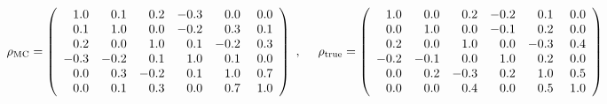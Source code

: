 \[
  \rho_{\rm MC} =
  \left(
  \begin{array}{rrrrrr}
    1.0 & 0.1 & 0.2 & -0.3 & 0.0 & 0.0 \\
    0.1 & 1.0 & 0.0 & -0.2 & 0.3 & 0.1 \\
    0.2 & 0.0 & 1.0 & 0.1 & -0.2 & 0.3 \\
    -0.3 & -0.2 & 0.1 & 1.0 & 0.1 & 0.0 \\
    0.0 & 0.3 & -0.2 & 0.1 & 1.0 & 0.7 \\
    0.0 & 0.1 & 0.3 & 0.0 & 0.7 & \ 1.0 \\  
  \end{array}
  \right) \ ,
\ \ \ \
  \rho_{\rm true} =
  \left(
  \begin{array}{rrrrrr}
    1.0 & 0.0 & 0.2 & -0.2 & 0.1 & 0.0 \\
    0.0 & 1.0 & 0.0 & -0.1 & 0.2 & 0.0 \\
    0.2 & 0.0 & 1.0 & 0.0 & -0.3 & 0.4 \\
    -0.2 & -0.1 & 0.0 & 1.0 & 0.2 & 0.0 \\
    0.0 & 0.2 & -0.3 & 0.2 & 1.0 & 0.5 \\
    0.0 & 0.0 & 0.4 & 0.0 & 0.5 & \ 1.0 \\  
  \end{array}
  \right)
\]
